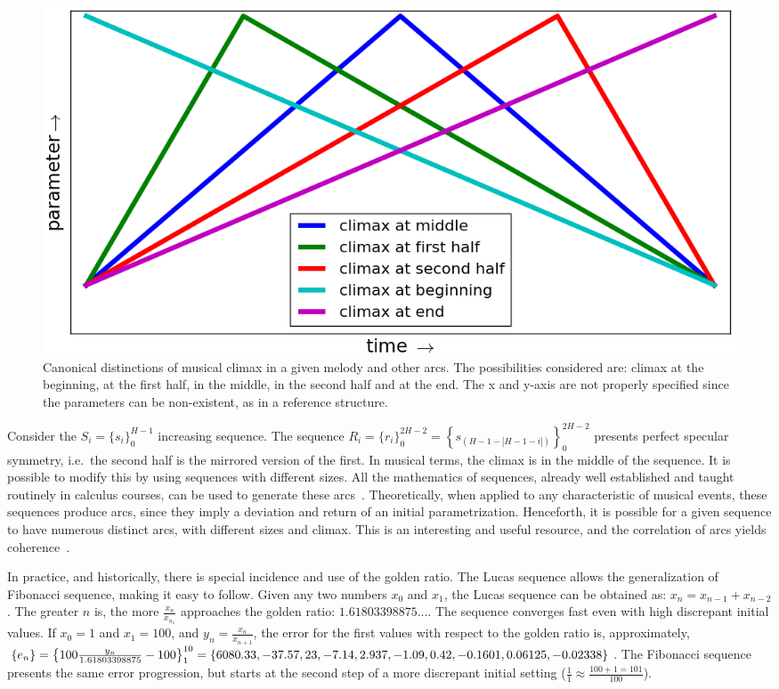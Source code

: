 \begin{figure}
    \centering
        \includegraphics[width=.8\columnwidth]{figures/climax_}
        \caption{Canonical distinctions of musical climax in a given melody and
        other arcs. The possibilities considered are: climax at the beginning, at the first half, in the middle, in the second half and 
        at the end. The x and y-axis are not properly specified since the parameters can be non-existent, as in a reference structure.}
        \label{fig:climax}
\end{figure}

Consider the $S_i=\{s_i\}_0^{H-1}$ increasing sequence. The sequence
$R_i=\{r_i\}_0^{2H -2}=\left\{s_{(H-1-|H-1-i|)}\right\}_0^{2H-2}$
presents perfect specular symmetry, i.e.\ the second half is the
mirrored version of the first. In musical terms, the climax is
in the middle of the sequence. It is possible to modify this
by using sequences with different sizes. All the mathematics of
sequences, already well established and taught routinely in calculus courses, can be used to generate these arcs~\cite{Guidorizzo,Schoenberg}.
Theoretically, when applied to any characteristic of musical events,
these sequences produce arcs, since they imply a deviation and return of an initial parametrization.
Henceforth, it is possible for a given sequence to have
numerous distinct arcs, with different sizes and climax. 
This is an interesting and useful resource, and the correlation of arcs yields coherence~\cite{Salzer}.

In practice, and historically, there is special incidence and use of the golden ratio. The Lucas sequence allows the generalization of
Fibonacci sequence, making it easy to follow. Given any two numbers $x_0$
and $x_1$, the Lucas sequence can be obtained as: $x_n=x_{n-1}+x_{n-2}$. The greater $n$ is, the more $\frac{x_{n}}{x_{n_1}}$ approaches the golden ratio:
$1.61803398875...$. The sequence converges fast even with high discrepant
initial values. If $x_0=1$ and $x_1=100$, and $y_n=\frac{x_n}{x_{n+1}}$, the error for the first values with
respect to the golden ratio is, approximately, $\{ e_n \}
=\left\{100\frac{y_n}{1.61803398875}-100 \right\}_1^{10}=\{6080.33, -37.57, 23,
-7.14, 2.937, -1.09, 0.42, -0.1601, \\ 0.06125, -0.02338\}$. The Fibonacci sequence
presents the same error progression, but starts at the second step of a more discrepant initial setting
($\frac{1}{1}\approx\frac{100+1 = 101}{100}$).

